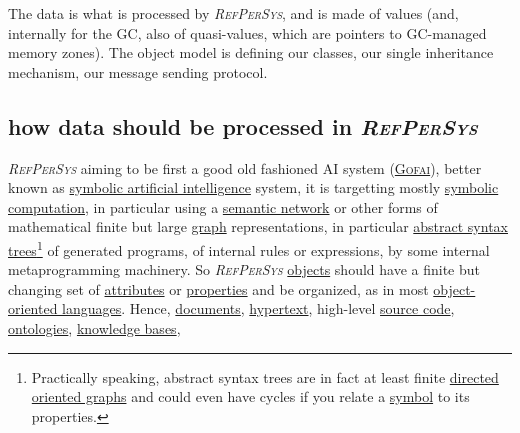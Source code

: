 \documentclass[11pt,a4paper,svgnames]{article}
\newcommand{\RefPerSys}{{\textit{\textsc{RefPerSys}}}}
\begin{document}
The data is what is processed by {\RefPerSys}, and is made of values
(and, internally for the GC, also of quasi-values, which are pointers
to GC-managed memory zones). The object model is defining our classes,
our single inheritance mechanism, our message sending protocol.

\subsection{how data should be processed in \RefPerSys}
\label{subsec:howdata}

{\RefPerSys} aiming to be first a good old fashioned AI system
(\href{http://bootstrappingartificialintelligence.fr/WordPress3/2013/12/the-future-of-ai-is-the-good-old-fashioned-artificial-intelligence/}{\textsc{Gofai}}),
better known as
\href{https://en.wikipedia.org/wiki/Symbolic\_artificial\_intelligence}{symbolic
  artificial intelligence} system, it is targetting mostly
\href{https://en.wikipedia.org/wiki/Computer\_algebra}{symbolic
  computation}, in particular using a
\href{https://en.wikipedia.org/wiki/Semantic\_network}{semantic
  network} or other forms of mathematical finite but large
\href{https://en.wikipedia.org/wiki/Graph\_(discrete\_mathematics)}{graph}
representations, in particular
\href{https://en.wikipedia.org/wiki/Abstract\_syntax\_tree}{abstract
  syntax trees}\footnote{Practically speaking, abstract syntax trees
are in fact at least finite
\href{https://en.wikipedia.org/wiki/Directed_acyclic_graph}{directed
  oriented graphs} and could even have cycles if you relate a
\href{https://en.wikipedia.org/wiki/Symbol\_(programming)}{symbol} to
its properties.} of generated programs, of internal rules or
expressions, by some internal metaprogramming machinery. So
{\RefPerSys}
\href{https://en.wikipedia.org/wiki/Object_(computer_science)}{objects}
should have a finite but changing set of
\href{https://en.wikipedia.org/wiki/Attribute_(computing)}{attributes}
or
\href{https://en.wikipedia.org/wiki/Property_(programming)}{properties}
and be organized, as in most
\href{https://en.wikipedia.org/wiki/Object-oriented_programming}{object-oriented
  languages}. Hence,
\href{https://en.wikipedia.org/wiki/Electronic\_document}{documents},
\href{https://en.wikipedia.org/wiki/Hypertext}{hypertext}, high-level
\href{https://en.wikipedia.org/wiki/Source\_code}{source code},
\href{https://en.wikipedia.org/wiki/Ontology\_(information\_science)}{ontologies},
\href{https://en.wikipedia.org/wiki/Knowledge\_base}{knowledge bases},
\end{document}
